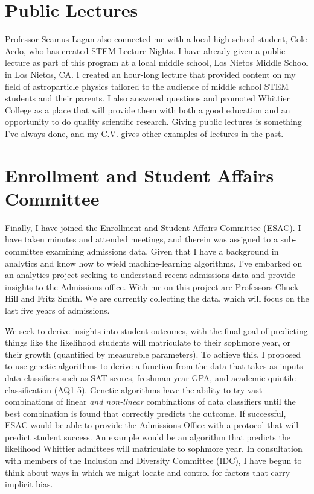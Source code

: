\documentclass[../main.tex]{subfiles}
\begin{document}
\section{Public Lectures}

Professor Seamus Lagan also connected me with a local high school student, Cole Aedo, who has created STEM Lecture Nights.  I have already given a public lecture as part of this program at a local middle school, Los Nietos Middle School in Los Nietos, CA.  I created an hour-long lecture that provided content on my field of astroparticle physics tailored to the audience of middle school STEM students and their parents.  I also answered questions and promoted Whittier College as a place that will provide them with both a good education and an opportunity to do quality scientific research.  Giving public lectures is something I've always done, and my C.V. gives other examples of lectures in the past.

\section{Enrollment and Student Affairs Committee}

Finally, I have joined the Enrollment and Student Affairs Committee (ESAC).  I have taken minutes and attended meetings, and therein was assigned to a sub-committee examining admissions data.  Given that I have a background in analytics and know how to wield machine-learning algorithms, I've embarked on an analytics project seeking to understand recent admissions data and provide insights to the Admissions office.  With me on this project are Professors Chuck Hill and Fritz Smith.  We are currently collecting the data, which will focus on the last five years of admissions.  \\ \hspace{0.1cm}

We seek to derive insights into student outcomes, with the final goal of predicting things like the likelihood students will matriculate to their sophmore year, or their growth (quantified by measureble parameters).  To achieve this, I proposed to use genetic algorithms to derive a function from the data that takes as inputs data classifiers such as SAT scores, freshman year GPA, and academic quintile classification (AQ1-5).  Genetic algorithms have the ability to try vast combinations of linear \textit{and non-linear} combinations of data classifiers until the best combination is found that correctly predicts the outcome.  If successful, ESAC would be able to provide the Admissions Office with a protocol that will predict student success.  An example would be an algorithm that predicts the likelihood Whittier admittees will matriculate to sophmore year.  In consultation with members of the Inclusion and Diversity Committee (IDC), I have begun to think about ways in which we might locate and control for factors that carry implicit bias.
\end{document}
